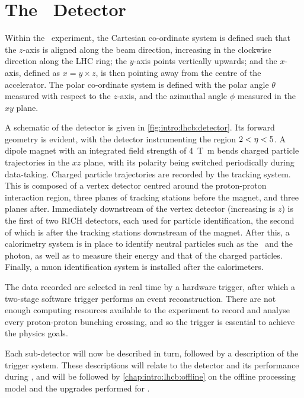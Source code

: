 \section{The \lhcb\ Detector}
\label{chap:intro:lhcb:detector}

Within the \lhcb\ experiment, the Cartesian co-ordinate system is defined such 
that the $z$-axis is aligned along the beam direction, increasing in the 
clockwise direction along the \ac{LHC} ring; the $y$-axis points vertically 
upwards; and the $x$-axis, defined as $x = y \times z$, is then pointing away 
from the centre of the accelerator.
The polar co-ordinate system is defined with the polar angle $\theta$ measured 
with respect to the $z$-axis, and the azimuthal angle $\phi$ measured in the 
$xy$ plane.

A schematic of the detector is given in \cref{fig:intro:lhcb:detector}.
Its forward geometry is evident, with the detector instrumenting the region $2 
< \eta < 5$.
A dipole magnet with an integrated field strength of \SI{4}{\tesla\metre} bends 
charged particle trajectories in the $xz$ plane, with its polarity being 
switched periodically during data-taking.
Charged particle trajectories are recorded by the tracking system.
This is composed of a vertex detector centred around the proton-proton 
interaction region, three planes of tracking stations before the magnet, and 
three planes after.
Immediately downstream of the vertex detector (increasing is $z$) is the first 
of two \ac{RICH} detectors, each used for particle identification, the second 
of which is after the tracking stations downstream of the magnet.
After this, a calorimetry system is in place to identify neutral particles such 
as the \Ppizero\ and the photon, as well as to measure their energy and that of 
the charged particles.
Finally, a muon identification system is installed after the calorimeters.

The data recorded are selected in real time by a hardware trigger, after which 
a two-stage software trigger performs an event reconstruction.
There are not enough computing resources available to the experiment to record 
and analyse every proton-proton bunching crossing, and so the trigger is 
essential to achieve the physics goals.

Each sub-detector will now be described in turn, followed by a description of 
the trigger system.
These descriptions will relate to the detector and its performance during 
\runone, and will be followed by \cref{chap:intro:lhcb:offline} on the offline 
processing model and the upgrades performed for \runtwo.

